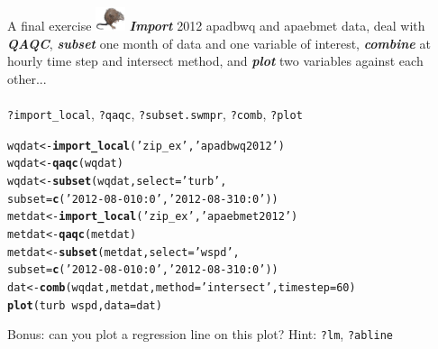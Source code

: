 \documentclass[xcolor=dvipsnames]{beamer}\usepackage[]{graphicx}\usepackage[]{color}
\makeatletter
\newcommand{\hlnum}[1]{\textcolor[rgb]{0.686,0.059,0.569}{#1}}%
\newcommand{\hlstr}[1]{\textcolor[rgb]{0.192,0.494,0.8}{#1}}%
\newcommand{\hlopt}[1]{\textcolor[rgb]{0,0,0}{#1}}%
\newcommand{\hlstd}[1]{\textcolor[rgb]{0.345,0.345,0.345}{#1}}%
\newcommand{\hlkwb}[1]{\textcolor[rgb]{0.69,0.353,0.396}{#1}}%
\newcommand{\hlkwc}[1]{\textcolor[rgb]{0.333,0.667,0.333}{#1}}%
\newcommand{\hlkwd}[1]{\textcolor[rgb]{0.737,0.353,0.396}{\textbf{#1}}}%
\newenvironment{kframe}{%
 \def\at@end@of@kframe{}%
 \ifinner\ifhmode%
  \def\at@end@of@kframe{\end{minipage}}%
  \begin{minipage}{\columnwidth}%
 \fi\fi%
 \def\FrameCommand##1{\hskip\@totalleftmargin \hskip-\fboxsep
 \colorbox{shadecolor}{##1}\hskip-\fboxsep
     \hskip-\linewidth \hskip-\@totalleftmargin \hskip\columnwidth}%
 \MakeFramed {\advance\hsize-\width
   \@totalleftmargin\z@ \linewidth\hsize
   \@setminipage}}%
 {\par\unskip\endMakeFramed%
 \at@end@of@kframe}
\newenvironment{knitrout}{}{} %
\newcommand{\Bigtxt}[1]{\textbf{\textit{#1}}}
\makeatother
\begin{document}
\begin{frame}[fragile]{A final exercise \includegraphics[width = 0.065\textwidth]{imgs/swmprat.png}}
\onslide<+->
\Bigtxt{Import} 2012 apadbwq and apaebmet data, deal with \Bigtxt{QAQC}, \Bigtxt{subset} one month of data and one variable of interest, \Bigtxt{combine} at hourly time step and intersect method, and \Bigtxt{plot} two variables against each other... \\~\\
\onslide<+->
\texttt{?import\_local}, \texttt{?qaqc}, \texttt{?subset.swmpr}, \texttt{?comb}, \texttt{?plot}
\onslide<+->
\begin{knitrout}\scriptsize
{}\color{fgcolor}\begin{kframe}
\begin{alltt}
\hlstd{wqdat} \hlkwb{<-} \hlkwd{import_local}\hlstd{(}\hlstr{'zip_ex'}\hlstd{,} \hlstr{'apadbwq2012'}\hlstd{)}
\hlstd{wqdat} \hlkwb{<-} \hlkwd{qaqc}\hlstd{(wqdat)}
\hlstd{wqdat} \hlkwb{<-} \hlkwd{subset}\hlstd{(wqdat,} \hlkwc{select} \hlstd{=} \hlstr{'turb'}\hlstd{,}
  \hlkwc{subset} \hlstd{=} \hlkwd{c}\hlstd{(}\hlstr{'2012-08-01 0:0'}\hlstd{,} \hlstr{'2012-08-31 0:0'}\hlstd{))}
\hlstd{metdat} \hlkwb{<-} \hlkwd{import_local}\hlstd{(}\hlstr{'zip_ex'}\hlstd{,} \hlstr{'apaebmet2012'}\hlstd{)}
\hlstd{metdat} \hlkwb{<-} \hlkwd{qaqc}\hlstd{(metdat)}
\hlstd{metdat} \hlkwb{<-} \hlkwd{subset}\hlstd{(metdat,} \hlkwc{select} \hlstd{=} \hlstr{'wspd'}\hlstd{,}
 \hlkwc{subset} \hlstd{=} \hlkwd{c}\hlstd{(}\hlstr{'2012-08-01 0:0'}\hlstd{,} \hlstr{'2012-08-31 0:0'}\hlstd{))}
\hlstd{dat} \hlkwb{<-} \hlkwd{comb}\hlstd{(wqdat, metdat,} \hlkwc{method} \hlstd{=} \hlstr{'intersect'}\hlstd{,} \hlkwc{timestep} \hlstd{=} \hlnum{60}\hlstd{)}
\hlkwd{plot}\hlstd{(turb} \hlopt{~} \hlstd{wspd,} \hlkwc{data} \hlstd{= dat)}
\end{alltt}
\end{kframe}
\end{knitrout}
\onslide<+->
Bonus: can you plot a regression line on this plot? Hint: \texttt{?lm}, \texttt{?abline}
\end{frame}

\end{document}
